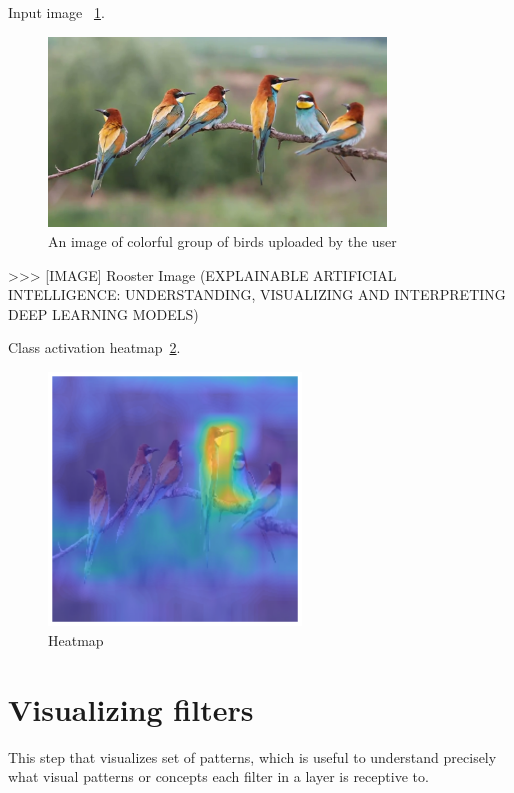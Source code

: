 Input image ~\ref{fig:myFig}.
\begin{figure}[htbp]
\centering
\includegraphics[width=0.80\textwidth]{images/colorful-group-of-birds-get-together_vkmuak6_e__F0000.png}
\caption{An image of colorful group of birds uploaded by the user}
\label{fig:myFig}
\end{figure}

>>> [IMAGE] Rooster Image (EXPLAINABLE ARTIFICIAL INTELLIGENCE: UNDERSTANDING, VISUALIZING AND INTERPRETING DEEP LEARNING MODELS)

Class activation heatmap~\ref{fig:heatmap-1}.
\begin{figure}[htbp]
\centering
\includegraphics[width=0.60\textwidth]{images/heatmap-class-activations.png}
\caption{}
\label{fig:heatmap-1}
\caption{Heatmap}
\end{figure}

\section*{Visualizing filters}

This step that visualizes set of patterns, which is useful to understand precisely what visual patterns or concepts each filter in a layer is receptive to.

